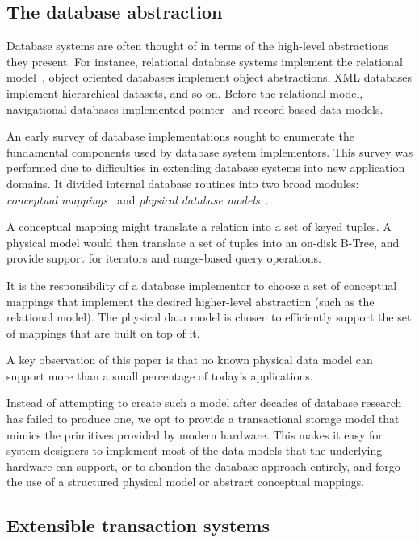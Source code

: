 \documentclass[letterpaper,twocolumn,10pt]{article}
\begin{document}
\subsection{The database abstraction}

Database systems are often thought of in terms of the high-level
abstractions they present.  For instance, relational database systems
implement the relational model~\cite{codd}, object oriented
databases implement object abstractions, XML databases implement
hierarchical datasets, and so on.  Before the relational model,
navigational databases implemented pointer- and record-based data models.

An early survey of database implementations sought to enumerate the
fundamental components used by database system implementors.  This
survey was performed due to difficulties in extending database systems
into new application domains.  It divided internal database
routines into two broad modules: {\em conceptual
mappings}~\cite{batoryConceptual} and {\em physical
database models}~\cite{batoryPhysical}.

A conceptual mapping might translate a relation into a set of keyed
tuples.  A physical model would then translate a set of tuples into an
on-disk B-Tree, and provide support for iterators and range-based query
operations.

It is the responsibility of a database implementor to choose a set of
conceptual mappings that implement the desired higher-level
abstraction (such as the relational model).  The physical data model
is chosen to efficiently support the set of mappings that are built on
top of it.

A key observation of this paper is that no known physical data model
can support more than a small percentage of today's applications.

Instead of attempting to create such a model after decades of database
research has failed to produce one, we opt to provide a transactional
storage model that mimics the primitives provided by modern hardware.
This makes it easy for system designers to implement most of the data
models that the underlying hardware can support, or to
abandon the database approach entirely, and forgo the use of a
structured physical model or abstract conceptual mappings.

\subsection{Extensible transaction systems} 
\end{document}
